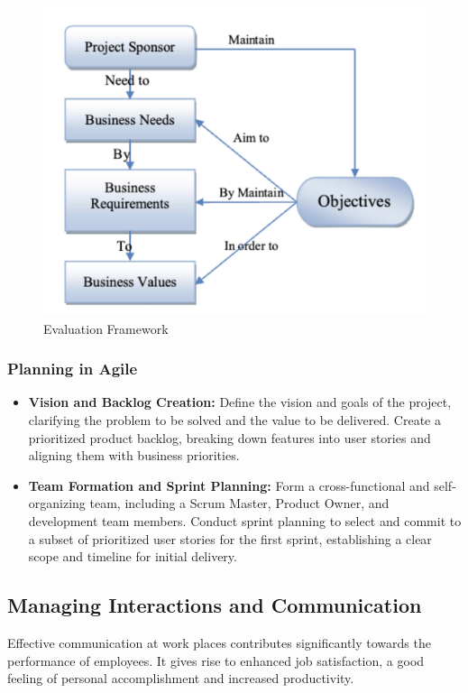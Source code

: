 \documentclass[runningheads]{llncs}
\begin{document}
\begin{figure}
    \centering
    \includegraphics[width=0.8\linewidth]{EvaluationFramework.png}
    \caption{Evaluation Framework}
    \label{fig:evalframework}
\end{figure}

\subsubsection{Planning in Agile}
\begin{itemize}[label=$\bullet$]
    \item \textbf{Vision and Backlog Creation:}
    Define the vision and goals of the project, clarifying the problem to be solved and the value to be delivered. Create a prioritized product backlog, breaking down features into user stories and aligning them with business priorities.\cite{agile}

    \item \textbf{Team Formation and Sprint Planning:}
    Form a cross-functional and self-organizing team, including a Scrum Master, Product Owner, and development team members.
    Conduct sprint planning to select and commit to a subset of prioritized user stories for the first sprint, establishing a clear scope and timeline for initial delivery.
    
\end{itemize}

\subsection{Managing Interactions and Communication}
Effective communication at work places contributes significantly
towards the performance of employees. It gives rise to enhanced
job satisfaction, a good feeling of personal accomplishment and
increased productivity.\cite{communication}
\end{document}
